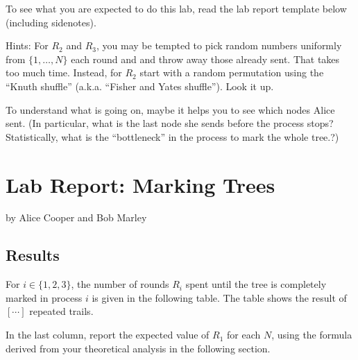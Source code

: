 \documentclass{tufte-handout}
\begin{document}
To see what you are expected to do this lab, read the lab report template below (including sidenotes).


Hints: For $R_2$ and $R_3$, you may be tempted to pick random numbers uniformly from $\{1,\ldots , N\}$ each round and and throw away those already sent. That takes too much time. Instead, for $R_2$ start with a random permutation using the ``Knuth shuffle'' (a.k.a. ``Fisher and Yates shuffle''). Look it up.

To understand what is going on, maybe it helps you to see which nodes Alice sent. (In particular, what is the last node she sends before the process stops? Statistically, what is the ``bottleneck'' in the process to mark the whole tree.?)




\newpage
\section{Lab Report: Marking Trees}


by Alice Cooper and Bob Marley


\subsection{Results}


For $i \in \{1, 2, 3\}$, the number of rounds $R_i$ spent until the tree is completely marked in process $i$ is given in the following table. The table shows the result of $[\cdots]$ repeated trails.

In the last column, report the expected value of $R_1$ for each $N$, using the formula derived from your theoretical analysis in the following section.
\end{document}

